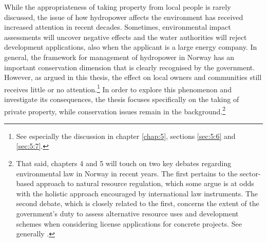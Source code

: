While the appropriateness of taking property from local people is rarely discussed, the issue of how hydropower affects the environment has received increased attention in recent decades. Sometimes, environmental impact assessments will uncover negative effects and the water authorities will reject development applications, also when the applicant is a large energy company. In general, the framework for management of hydropower in Norway has an important conservation dimension that is clearly recognised by the government.  However, as argued in this thesis, the effect on local owners and communities still receives little or no attention.\footnote{See especially the discussion in chapter \ref{chap:5}, sections \ref{sec:5:6} and \ref{sec:5:7}.} In order to explore this phenomenon and investigate its consequences, the thesis focuses specifically on the taking of private property, while conservation issues remain in the background.\footnote{That said, chapters 4 and 5 will touch on two key debates regarding environmental law in Norway in recent years. The first pertains to the sector-based approach to natural resource regulation, which some argue is at odds with the holistic approach encouraged by international law instruments. The second debate, which is closely related to the first, concerns the extent of the government's duty to assess alternative resource uses and development schemes when considering license applications for concrete projects. See generally \cite{winge13,backer12,backer10}.}


